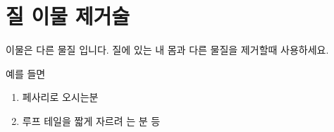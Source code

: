 \section{질 이물 제거술}
{이물은 다른 물질 입니다. 질에 있는 내 몸과 다른 물질을 제거할때 사용하세요.\par
예를 들면
\begin{enumerate}\tightlist
\item 페사리로 오시는분
\item 루프 테일을 짧게 자르려 는 분 등
\end{enumerate}}
